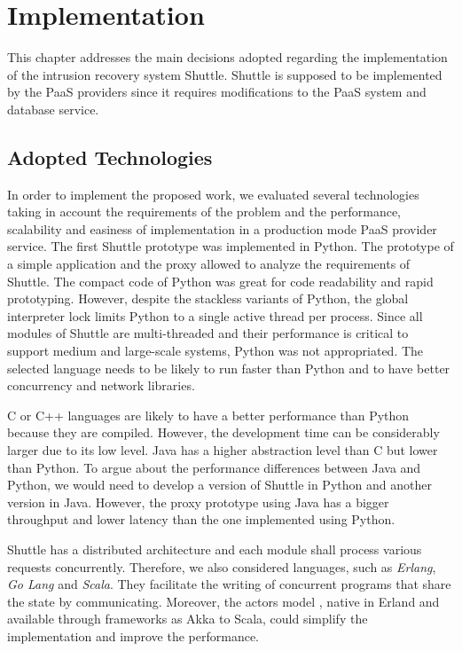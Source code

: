 \chapter{Implementation}\label{chapter:implementation}
This chapter addresses the main decisions adopted regarding the implementation of the intrusion recovery system Shuttle. Shuttle is supposed to be implemented by the \ac{PaaS} providers since it requires modifications to the \ac{PaaS} system and database service.

\section{Adopted Technologies}\label{sec:impl:adopted_technologies}
In order to implement the proposed work, we evaluated several technologies taking in account the requirements of the problem and the performance, scalability and easiness of implementation in a production mode \ac{PaaS} provider service.
The first Shuttle prototype was implemented in Python. The prototype of a simple application and the proxy allowed to analyze the requirements of Shuttle. The compact code of Python was great for code readability and rapid prototyping. However, despite the stackless variants of Python, the global interpreter lock limits Python to a single active thread per process. Since all modules of Shuttle are multi-threaded and their performance is critical to support medium and large-scale systems, Python was not appropriated. The selected language needs to be likely to run faster than Python and to have better concurrency and network libraries.

C or C++ languages are likely to have a better performance than Python because they are compiled. However, the development time can be considerably larger due to its low level. 
Java has a higher abstraction level than C but lower than Python. To argue about the performance differences between Java and Python, we would need to develop a version of Shuttle in Python and another version in Java. However, the proxy prototype using Java has a bigger throughput and lower latency than the one implemented using Python. 

Shuttle has a distributed architecture and each module shall process various requests concurrently. Therefore, we also considered languages, such as \emph{Erlang}, \emph{Go Lang} and \emph{Scala}. They facilitate the writing of concurrent programs that share the state by communicating. Moreover, the actors model \cite{actors}, native in Erland and available through frameworks as Akka \cite{akka} to Scala, could simplify the implementation and improve the performance. 

